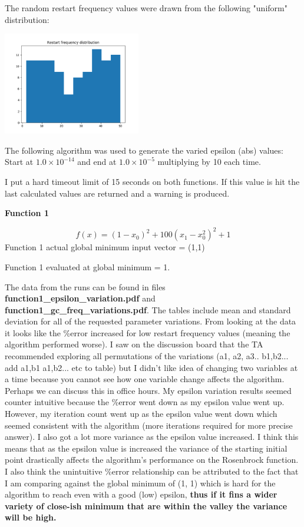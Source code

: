 \documentclass[11pt]{article}
\begin{document}
\begin{enumerate}
The random restart frequency values were drawn from the following "uniform" distribution:

\includegraphics[width=6cm]{restart_frequency_dist.png}

The following algorithm was used to generate the varied epsilon (abs) values: Start at $ 1.0 \times 10^{-14} $ and end at $ 1.0 \times 10^{-5} $ multiplying by 10 each time.

I put a hard timeout limit of 15 seconds on both functions. If this value is hit the last calculated values are returned and a warning is produced.

{\bf Function 1}

$$ f(x) = (1 - x_0)^2 + 100(x_1 - x_0^2)^2 + 1 $$
Function 1 actual global minimum input vector = (1,1)

Function 1 evaluated at global minimum = 1.

The data from the runs can be found in files {\bf function1\_epsilon\_variation.pdf} and \\
{\bf function1\_gc\_freq\_variations.pdf}. The tables include mean and standard deviation for all of the requested parameter variations. From looking at the data it looks like the \%error increased for low restart frequency values (meaning the algorithm performed worse).  I saw on the discussion board that the TA recommended exploring all permutations of the variations (a1, a2, a3.. b1,b2... add a1,b1 a1,b2... etc to table) but I didn't like idea of changing two variables at a time because you cannot see how one variable change affects the algorithm. Perhaps we can discuss this in office hours. My epsilon variation results seemed counter intuitive because the \%error went down as my epsilon value went up. However, my iteration count went up as the epsilon value went down which seemed consistent with the algorithm (more iterations required for more precise answer). I also got a lot more variance as the epsilon value increased. I think this means that as the epsilon value is increased the variance of the starting initial point drastically affects the algorithm's performance on the Rosenbrock function. I also think the unintuitive \%error relationship can be attributed to the fact that I am comparing against the global minimum of (1, 1) which is hard for the algorithm to reach even with a good (low) epsilon, {\bf thus if it fins a wider variety of close-ish minimum that are within the valley the variance will be high.}


\end{enumerate}
\end{document}
